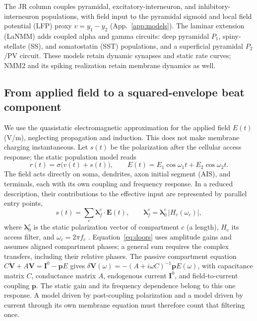 \documentclass[11pt,a4paper]{article}
\newcommand{\Sig}{\sigma}
\begin{document}
The JR column couples pyramidal, excitatory-interneuron, and inhibitory-interneuron
populations, with field input to the pyramidal sigmoid and local field potential
(LFP) proxy $v=y_1-y_2$ (App.~\ref{app:models}). The laminar extension (LaNMM)
\cite{ruffini2025cfc,sanchezTodo2023} adds coupled alpha and gamma circuits: deep
pyramidal $P_1$, spiny-stellate (SS), and somatostatin (SST) populations, and a
superficial pyramidal $P_2$/PV circuit. These models retain dynamic synapses and
static rate curves; NMM2 and its spiking realization retain membrane dynamics as well.

\subsection{From applied field to a squared-envelope beat component}\label{sec:coupling}
We use the quasistatic electromagnetic approximation for the applied field $E(t)$
(V/m), neglecting propagation and induction. This does not make membrane charging
instantaneous. Let $s(t)$ be the polarization after the cellular access response;
the static population model reads
\begin{equation}
r(t)=\Sig\!\big(v(t)+s(t)\big),\qquad
E(t)=E_1\cos\omega_1 t+E_2\cos\omega_2 t .
\label{eq:coupling}
\end{equation}
The field acts directly on soma, dendrites, axon initial segment (AIS), and terminals,
each with its own coupling and frequency response. In a reduced description, their
contributions to the effective input are represented by parallel entry points,
\begin{equation}
s(t)=\sum_c \boldsymbol\lambda^c_f\!\cdot\!\mathbf E(t),\qquad
\boldsymbol\lambda^c_f=\boldsymbol\lambda^c_0\,\lvert H_c(\omega_c)\rvert,
\label{eq:doors}
\end{equation}
where $\boldsymbol\lambda^c_0$ is the static polarization vector of compartment $c$ (a length),
$H_c$ its access filter, and $\omega_c=2\pi f_c$
\cite{ruffini2025rosetta,galangadea2023}. Equation~\eqref{eq:doors} uses amplitude
gains and assumes aligned compartment phases; a general sum requires the complex
transfers, including their relative phases. The passive
compartment equation $C\dot{\mathbf V}+A\mathbf V=\mathbf I^0-\mathbf pE$
\cite{ruffini2021nmm2} gives
$\delta\mathbf V(\omega)=-(A+i\omega C)^{-1}\mathbf pE(\omega)$, with capacitance
matrix $C$, conductance matrix $A$, endogenous current $\mathbf I^0$, and field-to-current
coupling $\mathbf p$. The static gain and its frequency dependence belong to this
one response. A model driven by post-coupling polarization and a model driven by
current through its own membrane equation must therefore count that filtering once.
\end{document}
